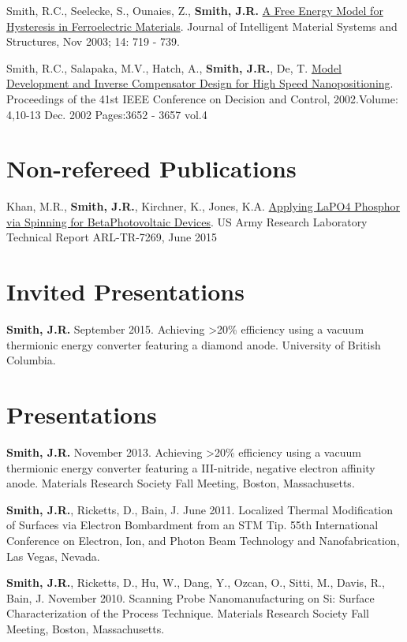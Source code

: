 Smith, R.C., Seelecke, S., Ounaies, Z., \textbf{Smith, J.R.}
\href{http://dx.doi.org/10.1177/1045389X03038841}{A Free Energy Model
for Hysteresis in Ferroelectric Materials}. Journal of Intelligent
Material Systems and Structures, Nov 2003; 14: 719 - 739.

Smith, R.C., Salapaka, M.V., Hatch, A., \textbf{Smith, J.R.}, De, T.
\href{http://dx.doi.org/10.1109/CDC.2002.1184930}{Model Development and
Inverse Compensator Design for High Speed Nanopositioning}. Proceedings
of the 41st IEEE Conference on Decision and Control, 2002.Volume:
4,10-13 Dec. 2002 Pages:3652 - 3657 vol.4

\section{Non-refereed Publications}

Khan, M.R., \textbf{Smith, J.R.}, Kirchner, K., Jones, K.A.
\href{http://www.dtic.mil/docs/citations/ADA621659}{Applying LaPO4
Phosphor via Spinning for BetaPhotovoltaic Devices}. US Army Research
Laboratory Technical Report ARL-TR-7269, June 2015

\section{Invited Presentations}\label{invited-presentations}

\textbf{Smith, J.R.} September 2015. Achieving \textgreater{}20\%
efficiency using a vacuum thermionic energy converter featuring a
diamond anode. University of British Columbia.

\section{Presentations}

\textbf{Smith, J.R.} November 2013. Achieving \textgreater{}20\%
efficiency using a vacuum thermionic energy converter featuring a
III-nitride, negative electron affinity anode. Materials Research
Society Fall Meeting, Boston, Massachusetts.

\textbf{Smith, J.R.}, Ricketts, D., Bain, J. June 2011. Localized
Thermal Modification of Surfaces via Electron Bombardment from an STM
Tip. 55th International Conference on Electron, Ion, and Photon Beam
Technology and Nanofabrication, Las Vegas, Nevada.

\textbf{Smith, J.R.}, Ricketts, D., Hu, W., Dang, Y., Ozcan, O., Sitti,
M., Davis, R., Bain, J. November 2010. Scanning Probe Nanomanufacturing
on Si: Surface Characterization of the Process Technique. Materials
Research Society Fall Meeting, Boston, Massachusetts.

